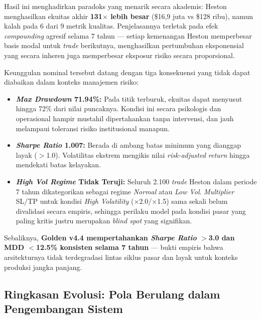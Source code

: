 Hasil ini menghadirkan paradoks yang menarik secara akademis: Heston menghasilkan ekuitas akhir \textbf{131$\times$ lebih besar} (\$16,9 juta vs \$128 ribu), namun kalah pada 6 dari 9 metrik kualitas. Penjelasannya terletak pada efek \textit{compounding} agresif selama 7 tahun --- setiap kemenangan Heston memperbesar basis modal untuk \textit{trade} berikutnya, menghasilkan pertumbuhan eksponensial yang secara inheren juga memperbesar eksposur risiko secara proporsional.

Keunggulan nominal tersebut datang dengan tiga konsekuensi yang tidak dapat diabaikan dalam konteks manajemen risiko:
\begin{itemize}
    \item \textbf{\textit{Max Drawdown} 71.94\%:} Pada titik terburuk, ekuitas dapat menyusut hingga 72\% dari nilai puncaknya. Kondisi ini secara psikologis dan operasional hampir mustahil dipertahankan tanpa intervensi, dan jauh melampaui toleransi risiko institusional manapun.
    \item \textbf{\textit{Sharpe Ratio} 1.007:} Berada di ambang batas minimum yang dianggap layak ($>$1.0). Volatilitas ekstrem mengikis nilai \textit{risk-adjusted return} hingga mendekati batas kelayakan.
    \item \textbf{\textit{High Vol Regime} Tidak Teruji:} Seluruh 2.100 \textit{trade} Heston dalam periode 7 tahun dikategorikan sebagai regime \textit{Normal} atau \textit{Low Vol}. \textit{Multiplier} SL/TP untuk kondisi \textit{High Volatility} ($\times$2.0/$\times$1.5) sama sekali belum divalidasi secara empiris, sehingga perilaku model pada kondisi pasar yang paling kritis justru merupakan \textit{blind spot} yang signifikan.
\end{itemize}

Sebaliknya, \textbf{Golden v4.4 mempertahankan \textit{Sharpe Ratio} $>$3.0 dan MDD $<$12.5\% konsisten selama 7 tahun} --- bukti empiris bahwa arsitekturnya tidak terdegradasi lintas siklus pasar dan layak untuk konteks produksi jangka panjang.

\subsection{Ringkasan Evolusi: Pola Berulang dalam Pengembangan Sistem}
\label{subsec:evolution_summary}

